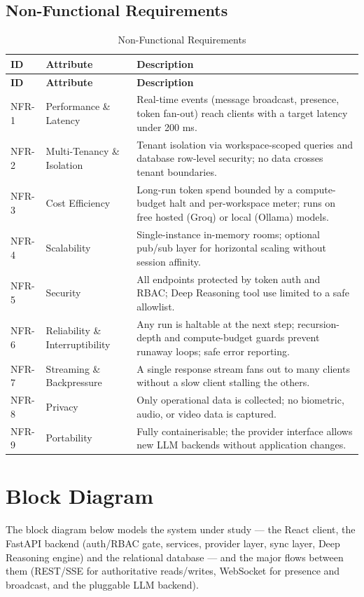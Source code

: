 \documentclass[12pt,a4paper]{report}
\begin{document}
\subsection{Non-Functional Requirements}
\begingroup
\setlength{\parskip}{0pt}\renewcommand{\arraystretch}{1.32}\footnotesize
\begin{xltabular}{\textwidth}{>{\hsize\raggedright\arraybackslash}X >{\hsize\raggedright\arraybackslash}X >{\hsize\raggedright\arraybackslash}X}
\caption{Non-Functional Requirements}\\
\toprule
\textbf{ID} & \textbf{Attribute} & \textbf{Description} \\
\midrule\endfirsthead
\toprule
\textbf{ID} & \textbf{Attribute} & \textbf{Description} \\
\midrule\endhead
\bottomrule\endfoot
NFR-1 & Performance \& Latency & Real-time events (message broadcast, presence, token fan-out) reach clients with a target latency under 200 ms. \\
NFR-2 & Multi-Tenancy \& Isolation & Tenant isolation via workspace-scoped queries and database row-level security; no data crosses tenant boundaries. \\
NFR-3 & Cost Efficiency & Long-run token spend bounded by a compute-budget halt and per-workspace meter; runs on free hosted (Groq) or local (Ollama) models. \\
NFR-4 & Scalability & Single-instance in-memory rooms; optional pub/sub layer for horizontal scaling without session affinity. \\
NFR-5 & Security & All endpoints protected by token auth and RBAC; Deep Reasoning tool use limited to a safe allowlist. \\
NFR-6 & Reliability \& Interruptibility & Any run is haltable at the next step; recursion-depth and compute-budget guards prevent runaway loops; safe error reporting. \\
NFR-7 & Streaming \& Backpressure & A single response stream fans out to many clients without a slow client stalling the others. \\
NFR-8 & Privacy & Only operational data is collected; no biometric, audio, or video data is captured. \\
NFR-9 & Portability & Fully containerisable; the provider interface allows new LLM backends without application changes. \\
\end{xltabular}
\endgroup

\section{Block Diagram}
The block diagram below models the system under study --- the React client, the FastAPI backend (auth/RBAC gate, services, provider layer, sync layer, Deep Reasoning engine) and the relational database --- and the major flows between them (REST/SSE for authoritative reads/writes, WebSocket for presence and broadcast, and the pluggable LLM backend).
\end{document}
